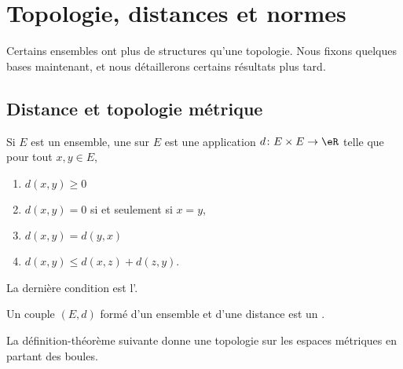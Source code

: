 \section{Topologie, distances et normes}
Certains ensembles ont plus de structures qu'une topologie. Nous fixons quelques bases maintenant, et nous détaillerons certains résultats plus tard.

\subsection{Distance et topologie métrique}

\begin{definition}  \label{DefMVNVFsX}
	Si \( E\) est un ensemble, une  sur \( E\) est une application \( d\colon E\times E\to \eR\) telle que pour tout \( x,y\in E\),
	\begin{enumerate}

		\item
		      \( d(x,y)\geq 0\)

		\item
		      \( d(x,y)=0\) si et seulement si \( x=y\),

		\item
		      \( d(x,y)=d(y,x)\)

		\item
		      \( d(x,y)\leq d(x,z)+d(z,y)\).

	\end{enumerate}
	La dernière condition est l'.

	Un couple \( (E,d)\) formé d'un ensemble et d'une distance est un .
\end{definition}

La définition-théorème suivante donne une topologie sur les espaces métriques en partant des boules.

